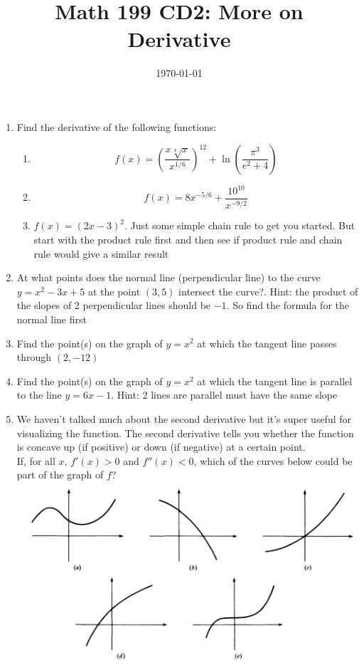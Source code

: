 \documentclass[12pt]{article}
\title{Math 199 CD2: More on Derivative}
\date{\today}
\begin{document}
	
	\maketitle
	
	\begin{enumerate}
		\item Find the derivative of the following functions: 
		\begin{enumerate}
			\item $$f(x)=\left(\frac{x \sqrt[4] x}{x^{1/6}}\right)^{12}+\ln\left(\frac{\pi^3}{e^2+4}\right)$$
			
			\vskip 4cm
			
			\item $$f(x)=8x^{-5/6}+\frac{10^{10}}{x^{-9/2}}$$
			
			\vskip 4cm
			\item $f(x) = (2x -3)^2$. Just some simple chain rule to get you started. But start with the product rule first and then see if product rule and chain rule would give a similar result
		\end{enumerate}
	\newpage
	
		\item At what points does the normal line (perpendicular line) to the curve $y = x^2 - 3x + 5$ at the point $(3, 5)$ 	intersect the curve?. Hint: the product of the slopes of 2 perpendicular lines should be $-1$. So find the formula for the normal line first  \\
		
		\vskip 7cm
		\item Find the point(s) on the graph of $y = x^2$ at which the tangent line passes through $(2, -12)$
		
		\vskip 7cm
		
		\item Find the point(s) on the graph of $y = x^2$ at which the tangent line is parallel to the line $y= 6x -1$. Hint: 2 lines are parallel must have the same slope
		
		\vskip 7cm
		
		\item We haven't talked much about the second derivative but it's super useful for visualizing the function. The second derivative tells you whether the function is concave up (if positive) or down (if negative) at a certain point.\\ 
		If, for all $x$, $f'(x)>0$ and $f''(x)<0$, which of the curves below could be part of the graph of $f$?  \\
		
		\includegraphics[scale=0.6]{p6.png}
	\end{enumerate}
	
	
	

	
\end{document}
